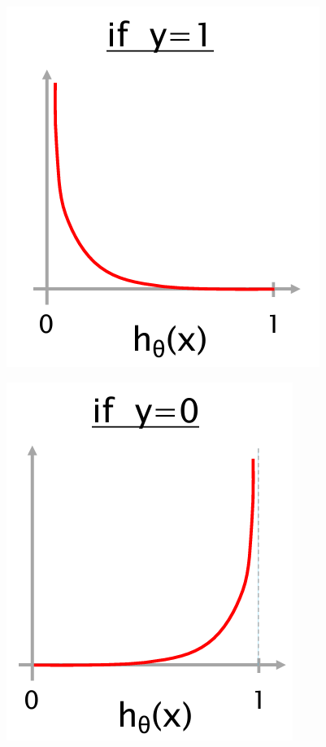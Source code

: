 \begin{multicols}{2}

    \begin{center}
        \centering
        \includegraphics[scale=0.7]{img/Loss_y1.png}
    \end{center}
    \newcolumn
    \begin{center}
        \centering
        \includegraphics[scale=0.7]{img/Loss_y0.png}
    \end{center}
\end{multicols}

